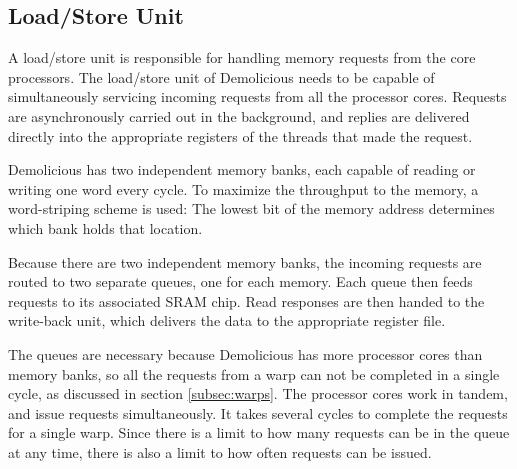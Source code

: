 \subsection{Load/Store Unit}
A load/store unit is responsible for handling memory requests from the core processors.
The load/store unit of Demolicious needs to be capable of simultaneously servicing incoming requests from all the processor cores.
Requests are asynchronously carried out in the background, and replies are delivered directly into the appropriate registers of the threads that made the request.

Demolicious has two independent memory banks, each capable of reading or writing one word every cycle.
To maximize the throughput to the memory, a word-striping scheme is used:
The lowest bit of the memory address determines which bank holds that location.

Because there are two independent memory banks, the incoming requests are routed to two separate queues, one for each memory.
Each queue then feeds requests to its associated SRAM chip.
Read responses are then handed to the write-back unit, which delivers the data to the appropriate register file.

The queues are necessary because Demolicious has more processor cores than memory banks, so all the requests from a warp can not be completed in a single cycle, as discussed in section \ref{subsec:warps}.
The processor cores work in tandem, and issue requests simultaneously.
It takes several cycles to complete the requests for a single warp.
Since there is a limit to how many requests can be in the queue at any time, there is also a limit to how often requests can be issued.
